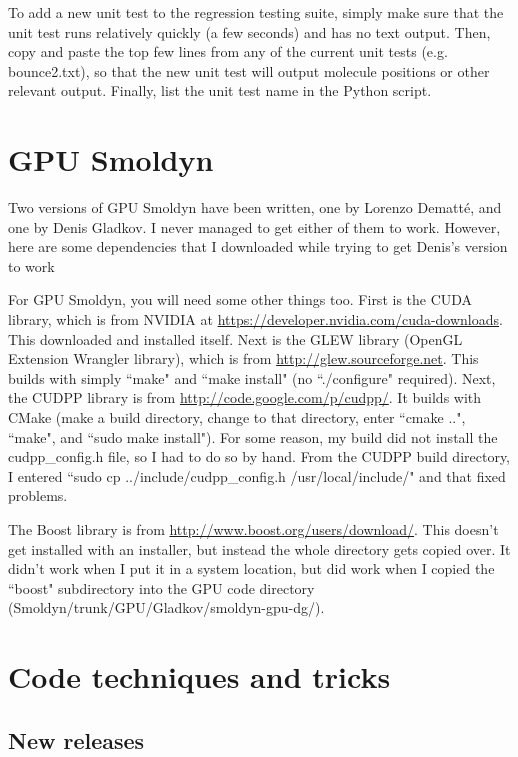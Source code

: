 \documentclass {scrbook}
\begin{document}
To add a new unit test to the regression testing suite, simply make sure that the unit test runs relatively quickly (a few seconds) and has no text output. Then, copy and paste the top few lines from any of the current unit tests (e.g. bounce2.txt), so that the new unit test will output molecule positions or other relevant output. Finally, list the unit test name in the Python script.

\section{GPU Smoldyn}

Two versions of GPU Smoldyn have been written, one by Lorenzo Dematt\'{e}, and one by Denis Gladkov. I never managed to get either of them to work. However, here are some dependencies that I downloaded while trying to get Denis's version to work

For GPU Smoldyn, you will need some other things too. First is the CUDA library, which is from NVIDIA at \url{https://developer.nvidia.com/cuda-downloads}. This downloaded and installed itself. Next is the GLEW library (OpenGL Extension Wrangler library), which is from \url{http://glew.sourceforge.net}. This builds with simply ``make" and ``make install" (no ``./configure" required). Next, the CUDPP library is from \url{http://code.google.com/p/cudpp/}. It builds with CMake (make a build directory, change to that directory, enter ``cmake ..", ``make", and ``sudo make install"). For some reason, my build did not install the cudpp\_config.h file, so I had to do so by hand. From the CUDPP build directory, I entered ``sudo cp ../include/cudpp\_config.h /usr/local/include/" and that fixed problems.

The Boost library is from \url{http://www.boost.org/users/download/}. This doesn't get installed with an installer, but instead the whole directory gets copied over. It didn't work when I put it in a system location, but did work when I copied the ``boost" subdirectory into the GPU code directory (Smoldyn/trunk/GPU/Gladkov/smoldyn-gpu-dg/).



\section{Code techniques and tricks}

\subsection{New releases}
\end{document}
